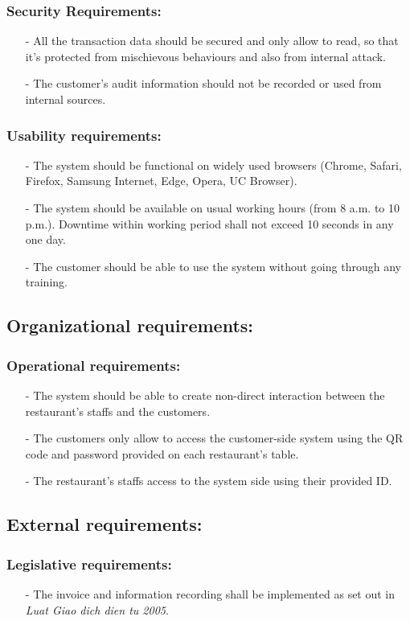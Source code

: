 \documentclass[a4paper,11pt]{extarticle}
\begin{document}
\subsubsection{Security Requirements:}
\begin{itemize}[wide=0pt]
    \item[-] All the transaction data should be secured and only allow to read, so that it’s protected from mischievous behaviours and also from internal attack.
    \item[-] The customer's audit information should not be recorded or used from internal sources.
\end{itemize}
\subsubsection{Usability requirements:}
\begin{itemize}[wide=0pt]
    \item[-] The system should be functional on widely used browsers (Chrome, Safari, Firefox, Samsung Internet, Edge, Opera, UC Browser).
    \item[-] The system should be available on usual working hours (from 8 a.m. to 10 p.m.). Downtime within working period shall not exceed 10 seconds in any one day.
    \item[-] The customer should be able to use the system without going through any training.
\end{itemize}

\subsection{Organizational requirements:}
\subsubsection{Operational requirements:}
\begin{itemize}[wide=0pt]
    \item[-] The system should be able to create non-direct interaction between the restaurant's staffs and the customers.
    \item[-] The customers only allow to access the customer-side system using the QR code and password provided on each restaurant's table.
    \item[-] The restaurant's staffs access to the system side using their provided ID.
\end{itemize}

\subsection{External requirements:}
\subsubsection{Legislative requirements:}
\begin{itemize}[wide=0pt]
    \item[-] The invoice and information recording shall be implemented as set out in \emph{Luat Giao dich dien tu 2005}.
\end{itemize}
\end{document}
